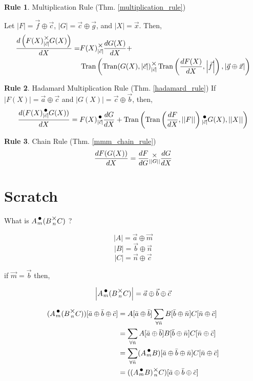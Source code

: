 \documentclass[12pt]{book}
\theoremstyle{plain}
\theoremstyle{definition}
\newtheorem{drule}{Rule}
\theoremstyle{ppart}
\theoremstyle{case}
\theoremstyle{solution}
\DeclareMathOperator{\Tran}{Tran}
\newcommand{\mmult}[1]{\text{\raisebox{1ex}{$\underset{#1}{\times}$}}}
\newcommand{\dmult}[1]{\text{\raisebox{1ex}{$\underset{#1}{\,\bullet\,}$}}}
\newcommand{\shape}[1]{\left|#1\right|}
\begin{document}
\begin{appendices}
\begin{drule}
Multiplication Rule
(Thm. \ref{multiplication_rule})

Let $\shape{F} = \vec{f} \oplus \vec{c}$, $\shape{G} = \vec{c} \oplus \vec{g}$,
and $\shape{X} = \vec{x}$. Then,
\begin{align*}
 \frac{d\left(F(X) \mmult{\shape{\vec{c}}} G(X)\right)}{dX} =&
 F(X) \mmult{\shape{\vec{c}}} \frac{dG(X)}{dX} + \\
 &\Tran\left(
   \Tran(G(X), \shape{\vec{c}})
     \mmult{\shape{\vec{c}}}
   \Tran\left(\frac{dF(X)}{dX}, \shape{\vec{f}}\right),
   \shape{\vec{g} \oplus \vec{x}}
 \right)
\end{align*}
\end{drule}

\begin{drule}
Hadamard Multiplication Rule
(Thm. \ref{hadamard_rule})
If $\shape{F(X)} = \vec{a} \oplus \vec{c}$ and $\shape{G(X)} = \vec{c} \oplus \vec{b}$, then,
\[
  \frac{d(F(X) \dmult{\shape{\vec{c}}} G(X))}{dX} =
    F(X) \dmult{\shape{\vec{c}}} \frac{dG}{dX} +
    \Tran\left(\Tran\left(\frac{dF}{dX}, \shape{\shape{F}}\right) \dmult{\shape{\vec{c}}} G(X), \shape{\shape{X}}\right)
\]
\end{drule}

\begin{drule}
Chain Rule
(Thm. \ref{mmm_chain_rule})
\[ \frac{dF(G(X))}{dX} = \frac{dF}{dG} \mmult{\shape{\shape{G}}} \frac{dG}{dX} \]
\end{drule}

\chapter{Scratch}

What is $A \dmult{m} (B \mmult{n} C)$ ?

\[ \shape{A} = \vec{a} \oplus \vec{m} \]
\[ \shape{B} = \vec{b} \oplus \vec{n} \]
\[ \shape{C} = \vec{n} \oplus \vec{c} \]

if $\vec{m} = \vec{b}$ then,

\[ \shape{A \dmult{m} (B \mmult{n} C)} = \vec{a} \oplus \vec{b} \oplus \vec{c} \]

\begin{align*}
(A \dmult{m} (B \mmult{n} C))[\bar{a} \oplus \bar{b} \oplus \bar{c}]
  &=
  A[\bar{a} \oplus \bar{b}] \sum_{\forall \bar{n}} B[\bar{b} \oplus \bar{n}] C[\bar{n} \oplus \bar{c}] \\
  &=
  \sum_{\forall \bar{n}} A[\bar{a} \oplus \bar{b}] B[\bar{b} \oplus \bar{n}] C[\bar{n} \oplus \bar{c}] \\
  &=
  \sum_{\forall \bar{n}} (A \dmult{m} B)[\bar{a} \oplus \bar{b} \oplus \bar{n}] C[\bar{n} \oplus \bar{c}] \\
  &= ((A \dmult{m} B) \mmult{n} C)[\bar{a} \oplus \bar{b} \oplus \bar{c}]
\end{align*}


\end{appendices}
\end{document}
